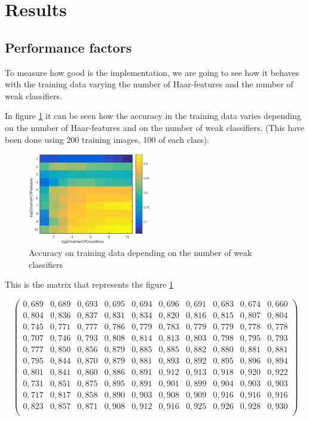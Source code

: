 \documentclass{article}
\begin{document}
\section{Results}

\subsection{Performance factors}

To measure how good is the implementation, we are going to see how it behaves with the training data varying the number of Haar-features and the number of weak classifiers. 

In figure \ref{fig:accuracyOnTrainingFeaturesClassifiers} it can be seen how the accuracy in the training data varies depending on the number of Haar-features and on the number of weak classifiers. (This have been done using 200 training images, 100 of each class).

\begin{figure}[h]
\centering
\includegraphics[height=4cm]{images/accuracyOnTrainingFeaturesClassifiers}
\caption{Accuracy on training data depending on the number of weak classifiers}
\label{fig:accuracyOnTrainingFeaturesClassifiers}
\end{figure}

This is the matrix that represents the figure \ref{fig:accuracyOnTrainingFeaturesClassifiers} 

$$\begin{pmatrix}
0,689 & 0,689 & 0,693 & 0,695 & 0,694 & 0,696 & 0,691 & 0,683 & 0,674 & 0,660 \\ 
0,804 & 0,836 & 0,837 & 0,831 & 0,834 & 0,820 & 0,816 & 0,815 & 0,807 & 0,804 \\ 
0,745 & 0,771 & 0,777 & 0,786 & 0,779 & 0,783 & 0,779 & 0,779 & 0,778 & 0,778 \\
0,707 & 0,746 & 0,793 & 0,808 & 0,814 & 0,813 & 0,803 & 0,798 & 0,795 & 0,793 \\
0,777 & 0,850 & 0,856 & 0,879 & 0,885 & 0,885 & 0,882 & 0,880 & 0,881 & 0,881 \\
0,795 & 0,844 & 0,870 & 0,879 & 0,881 & 0,893 & 0,892 & 0,895 & 0,896 & 0,894 \\
0,801 & 0,841 & 0,860 & 0,886 & 0,891 & 0,912 & 0,913 & 0,918 & 0,920 & 0,922 \\
0,731 & 0,851 & 0,875 & 0,895 & 0,891 & 0,901 & 0,899 & 0,904 & 0,903 & 0,903 \\
0,717 & 0,817 & 0,858 & 0,890 & 0,903 & 0,908 & 0,909 & 0,916 & 0,916 & 0,916 \\
0,823 & 0,857 & 0,871 & 0,908 & 0,912 & 0,916 & 0,925 & 0,926 & 0,928 & 0,930 \\
\end{pmatrix}$$
\end{document}

